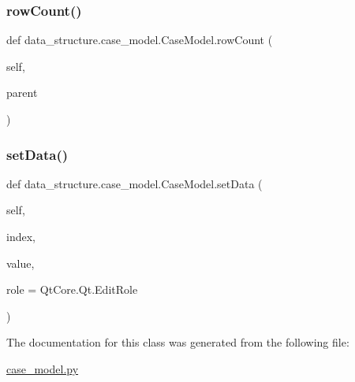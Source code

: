 \subsubsection{\texorpdfstring{row\+Count()}{rowCount()}}
{\footnotesize\ttfamily def data\+\_\+structure.\+case\+\_\+model.\+Case\+Model.\+row\+Count (\begin{DoxyParamCaption}\item[{}]{self,  }\item[{}]{parent }\end{DoxyParamCaption})}

\hypertarget{classdata__structure_1_1case__model_1_1_case_model_a9d7790fb94587e15b2c1b77a01e7845c}{}\label{classdata__structure_1_1case__model_1_1_case_model_a9d7790fb94587e15b2c1b77a01e7845c} 
\subsubsection{\texorpdfstring{set\+Data()}{setData()}}
{\footnotesize\ttfamily def data\+\_\+structure.\+case\+\_\+model.\+Case\+Model.\+set\+Data (\begin{DoxyParamCaption}\item[{}]{self,  }\item[{}]{index,  }\item[{}]{value,  }\item[{}]{role = {\ttfamily QtCore.Qt.EditRole} }\end{DoxyParamCaption})}



The documentation for this class was generated from the following file\+:\begin{DoxyCompactItemize}
\item 
\hyperlink{case__model_8py}{case\+\_\+model.\+py}\end{DoxyCompactItemize}
